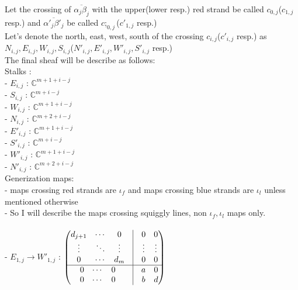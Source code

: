 Let the crossing of $\overline{\alpha_j \beta_j}$ with the upper(lower resp.) red strand be called $c_{0,j}$($c_{1,j}$ resp.) and $\overline{\alpha'_j \beta'_j}$ be called $c;_{0,j}$($c'_{1,j}$ resp.)\\

Let's denote the north, east, west, south of the crossing $c_{i,j}$($c'_{i,j}$ resp.) as $N_{i,j},E_{i,j},W_{i,j},S_{i,j}$($N'_{i,j},E'_{i,j},W'_{i,j},S'_{i,j}$ resp.)\\

The final sheaf will be describe as follows:\\

Stalks :\\
- $E_{i,j}$ : $\mathbb{C}^{m+1+i-j}$\\
- $S_{i,j}$ : $\mathbb{C}^{m+i-j}$\\
- $W_{i,j}$ : $\mathbb{C}^{m+1+i-j}$\\
- $N_{i,j}$ : $\mathbb{C}^{m+2+i-j}$\\

- $E'_{i,j}$ : $\mathbb{C}^{m+1+i-j}$\\
- $S'_{i,j}$ : $\mathbb{C}^{m+i-j}$\\
- $W'_{i,j}$ : $\mathbb{C}^{m+1+i-j}$\\
- $N'_{i,j}$ : $\mathbb{C}^{m+2+i-j}$\\

Generization maps:\\
- maps crossing red strands are $\iota_f$ and maps crossing blue strands are $\iota_l$ unless mentioned otherwise\\
- So I will describe the maps crossing squiggly lines, non $\iota_f,\iota_l$ maps only.\\
\\
- $E_{1,j}\rightarrow W'_{1,j}$ : 
$
\begin{pmatrix}
		\begin{matrix} 
			d_{j+1} & \cdots & 0 \\ 
			\vdots & \ddots & \vdots\\
			0 & \cdots & d_m
		\end{matrix} & \vline &
		\begin{matrix}
			0&0\\
			\vdots&\vdots\\
			0&0
		\end{matrix}\\
		\hline
		\begin{matrix}
			0&\cdots&0\\
			0&\cdots&0
		\end{matrix}
		& \vline &
		\begin{matrix}
			a&0\\
			b& d
		\end{matrix}
\end{pmatrix}
$\\

